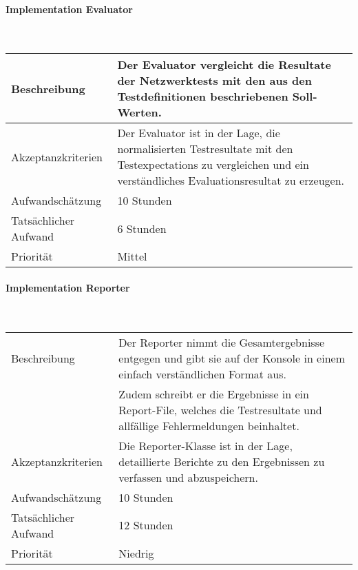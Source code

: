 \documentclass[]{subfiles}
\begin{document}
        \paragraph*{Implementation Evaluator}\mbox{} \\
        \begin{tabularx}{\textwidth}{lX}
            \toprule
            Beschreibung & Der Evaluator vergleicht die Resultate der Netzwerktests mit den aus den Testdefinitionen beschriebenen Soll-Werten.\\
            \midrule
            Akzeptanzkriterien & Der Evaluator ist in der Lage, die normalisierten Testresultate mit den Testexpectations zu vergleichen und ein verständliches Evaluationsresultat zu erzeugen.\\
            \midrule
            Aufwandschätzung & 10 Stunden\\
            Tatsächlicher Aufwand & 6 Stunden\\
            \midrule
            Priorität & Mittel \\
            \bottomrule
        \end{tabularx}
        \newpage
    
        \paragraph*{Implementation Reporter}\mbox{} \\
        \begin{tabularx}{\textwidth}{lX}
            \toprule
            Beschreibung & Der Reporter nimmt die Gesamtergebnisse entgegen und gibt sie auf der Konsole in einem einfach verständlichen Format aus. \\
            & Zudem schreibt er die Ergebnisse in ein Report-File, welches die Testresultate und allfällige Fehlermeldungen beinhaltet. \\
            \midrule
            Akzeptanzkriterien & Die Reporter-Klasse ist in der Lage, detaillierte Berichte zu den Ergebnissen zu verfassen und abzuspeichern.\\
            \midrule
            Aufwandschätzung & 10 Stunden\\
            Tatsächlicher Aufwand & 12 Stunden\\
            \midrule
            Priorität & Niedrig \\
            \bottomrule
        \end{tabularx}
    
\end{document}
